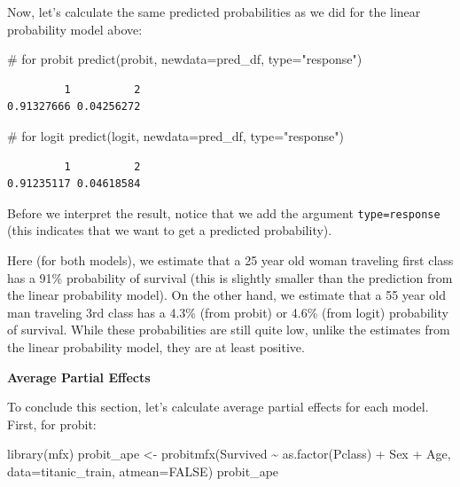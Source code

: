 \documentclass[
  letterpaper,
  DIV=11,
  numbers=noendperiod]{scrreprt}
\newenvironment{Shaded}{\begin{snugshade}}{\end{snugshade}}
\newcommand{\AttributeTok}[1]{\textcolor[rgb]{0.40,0.45,0.13}{#1}}
\newcommand{\CommentTok}[1]{\textcolor[rgb]{0.37,0.37,0.37}{#1}}
\newcommand{\ConstantTok}[1]{\textcolor[rgb]{0.56,0.35,0.01}{#1}}
\newcommand{\FunctionTok}[1]{\textcolor[rgb]{0.28,0.35,0.67}{#1}}
\newcommand{\NormalTok}[1]{\textcolor[rgb]{0.00,0.23,0.31}{#1}}
\newcommand{\OtherTok}[1]{\textcolor[rgb]{0.00,0.23,0.31}{#1}}
\newcommand{\SpecialCharTok}[1]{\textcolor[rgb]{0.37,0.37,0.37}{#1}}
\newcommand{\StringTok}[1]{\textcolor[rgb]{0.13,0.47,0.30}{#1}}
\begin{document}
Now, let's calculate the same predicted probabilities as we did for the
linear probability model above:

\begin{Shaded}
\begin{Highlighting}[]
\CommentTok{\# for probit}
\FunctionTok{predict}\NormalTok{(probit, }\AttributeTok{newdata=}\NormalTok{pred\_df, }\AttributeTok{type=}\StringTok{"response"}\NormalTok{)}
\end{Highlighting}
\end{Shaded}

\begin{verbatim}
         1          2 
0.91327666 0.04256272 
\end{verbatim}

\begin{Shaded}
\begin{Highlighting}[]
\CommentTok{\# for logit}
\FunctionTok{predict}\NormalTok{(logit, }\AttributeTok{newdata=}\NormalTok{pred\_df, }\AttributeTok{type=}\StringTok{"response"}\NormalTok{)}
\end{Highlighting}
\end{Shaded}

\begin{verbatim}
         1          2 
0.91235117 0.04618584 
\end{verbatim}

Before we interpret the result, notice that we add the argument
\texttt{type=response} (this indicates that we want to get a predicted
probability).

Here (for both models), we estimate that a 25 year old woman traveling
first class has a 91\% probability of survival (this is slightly smaller
than the prediction from the linear probability model). On the other
hand, we estimate that a 55 year old man traveling 3rd class has a 4.3\%
(from probit) or 4.6\% (from logit) probability of survival. While these
probabilities are still quite low, unlike the estimates from the linear
probability model, they are at least positive.

\textbf{Average Partial Effects}

To conclude this section, let's calculate average partial effects for
each model. First, for probit:

\begin{Shaded}
\begin{Highlighting}[]
\FunctionTok{library}\NormalTok{(mfx)}
\NormalTok{probit\_ape }\OtherTok{\textless{}{-}} \FunctionTok{probitmfx}\NormalTok{(Survived }\SpecialCharTok{\textasciitilde{}} \FunctionTok{as.factor}\NormalTok{(Pclass) }\SpecialCharTok{+}\NormalTok{ Sex }\SpecialCharTok{+}\NormalTok{ Age, }
                        \AttributeTok{data=}\NormalTok{titanic\_train, }
                        \AttributeTok{atmean=}\ConstantTok{FALSE}\NormalTok{)}
\NormalTok{probit\_ape}
\end{Highlighting}
\end{Shaded}
\end{document}
